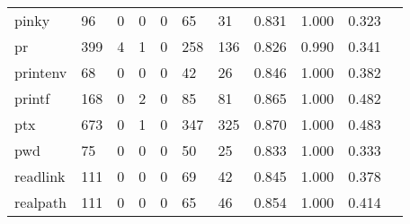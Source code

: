 \begin{longtable}{lp{1.10cm}p{1.10cm}p{1.10cm}p{1.10cm}p{1.10cm}p{1.10cm}p{1.10cm}p{1.10cm}p{1.10cm}p{1.10cm}}
pinky     &                     96 &                                  0 &                                 0 &                                0 &                                65 &                              31 &                          0.831 &                                 1.000 &                               0.323 \\
pr        &                    399 &                                  4 &                                 1 &                                0 &                               258 &                             136 &                          0.826 &                                 0.990 &                               0.341 \\
printenv  &                     68 &                                  0 &                                 0 &                                0 &                                42 &                              26 &                          0.846 &                                 1.000 &                               0.382 \\
printf    &                    168 &                                  0 &                                 2 &                                0 &                                85 &                              81 &                          0.865 &                                 1.000 &                               0.482 \\
ptx       &                    673 &                                  0 &                                 1 &                                0 &                               347 &                             325 &                          0.870 &                                 1.000 &                               0.483 \\
pwd       &                     75 &                                  0 &                                 0 &                                0 &                                50 &                              25 &                          0.833 &                                 1.000 &                               0.333 \\
readlink  &                    111 &                                  0 &                                 0 &                                0 &                                69 &                              42 &                          0.845 &                                 1.000 &                               0.378 \\
realpath  &                    111 &                                  0 &                                 0 &                                0 &                                65 &                              46 &                          0.854 &                                 1.000 &                               0.414 \\

\end{longtable}
